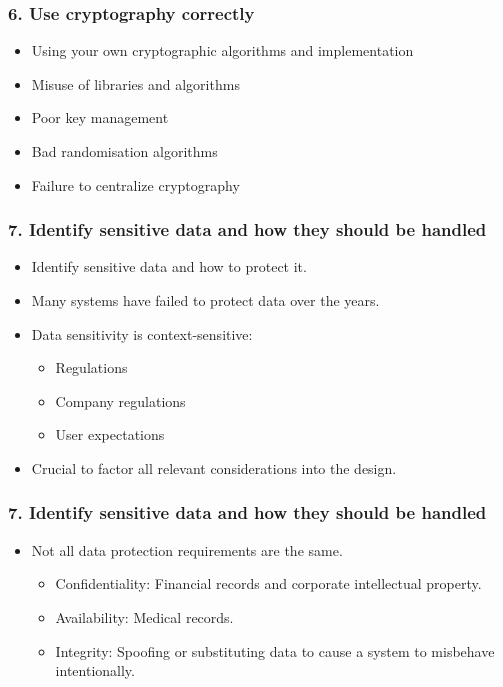 \documentclass[12pt,norsk]{beamer}
\begin{document}
\begin{frame}

	\frametitle{6. Use cryptography correctly}
	
	\begin{itemize}
		
	\item Using your own cryptographic algorithms and implementation
	\item Misuse of libraries and algorithms
	\item Poor key management
	\item Bad randomisation algorithms
	\item Failure to centralize cryptography
	\end{itemize}
\end{frame}

\begin{frame}

	\frametitle{7. Identify sensitive data and how they should be handled}
	\begin{itemize}
		\item Identify sensitive data and how to protect it.
		\item Many systems have failed to protect data over the years.
		\item Data sensitivity is context-sensitive:
		\begin{itemize}
			\item Regulations
			\item Company regulations
			\item User expectations
		\end{itemize}
		\item Crucial to factor all relevant considerations into the design.
		
	\end{itemize}
	

\end{frame}

\begin{frame}

	\frametitle{7. Identify sensitive data and how they should be handled}
	\begin{itemize}

		\item Not all data protection requirements are the same.
		\begin{itemize}
			\item Confidentiality: Financial records and corporate intellectual property.
			\item Availability: Medical records.
			\item Integrity: Spoofing or substituting data to cause a system to misbehave intentionally.
		\end{itemize}
		
		
	\end{itemize}
	

\end{frame}
\end{document}
